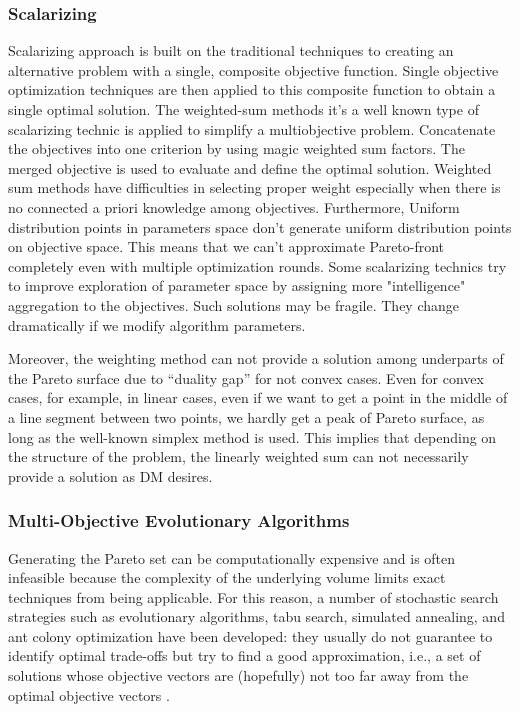             \subsubsection{Scalarizing}
                Scalarizing approach is built on the traditional techniques to creating an alternative problem with a single,
                composite objective function. Single objective optimization techniques are then applied to this composite function to obtain a single optimal solution.
                The weighted-sum methods it's a well known type of scalarizing technic is applied to simplify a multiobjective problem. Concatenate the objectives into one criterion by using magic weighted sum factors. 
                The merged objective is used to evaluate and define the optimal solution.
                Weighted sum methods have difficulties in selecting proper weight especially when there is no connected a priori knowledge among objectives.
                Furthermore, Uniform distribution points in parameters space don't generate uniform distribution points on objective space. This means that we can't approximate Pareto-front completely even with multiple optimization rounds.
                Some scalarizing technics try to improve exploration of parameter space by assigning more "intelligence" aggregation to the objectives. Such solutions may be fragile. They change dramatically if we modify algorithm parameters.

                Moreover, the weighting method can not provide a solution among underparts of the Pareto surface due to “duality gap” for not convex cases. Even for convex cases, for example, in linear cases, even if we want to get a point in the middle of a line segment between two points, we hardly get a peak of Pareto surface, as long as the well-known simplex method is used. This implies that depending on the structure of the problem, the linearly weighted sum can not necessarily provide a solution as DM desires. \cite{Nakayama05}

            \subsubsection{Multi-Objective Evolutionary Algorithms}

                Generating the Pareto set can be computationally expensive and is often infeasible because the complexity of the underlying volume limits exact techniques from being applicable. For this reason, a number of stochastic search strategies such as evolutionary algorithms, tabu search, simulated annealing, and ant colony optimization have been developed: they usually do not guarantee to identify optimal trade-offs but try to find a good approximation, i.e., a set of solutions whose objective vectors are (hopefully) not too far away from the optimal objective vectors \cite{EmmerichD18}.

